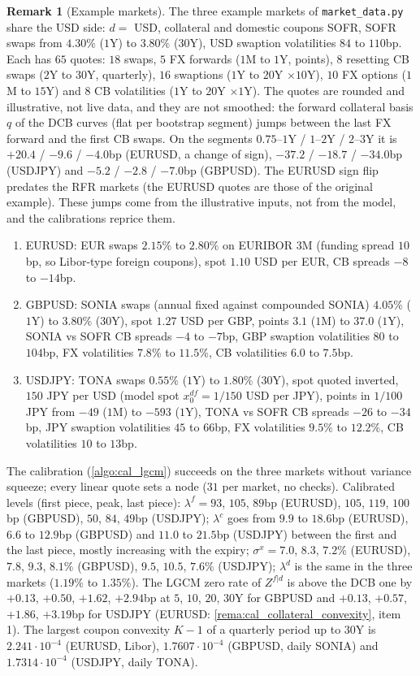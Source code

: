 \documentclass[11pt,english]{amsart}
\theoremstyle{definition}
\newtheorem{rema}{Remark}
\begin{document}
\begin{rema}[Example markets]\label{rema:cal_example_markets}
The three example markets of \texttt{market\_data.py} share the USD side: $d = $ USD, collateral and domestic coupons SOFR, SOFR swaps from $4.30\%$ ($1$Y) to $3.80\%$ ($30$Y), USD swaption volatilities $84$ to $110$bp. Each has $65$ quotes: $18$ swaps, $5$ FX forwards ($1$M to $1$Y, points), $8$ resetting CB swaps ($2$Y to $30$Y, quarterly), $16$ swaptions ($1$Y to $20$Y $\times10$Y), $10$ FX options ($1$M to $15$Y) and $8$ CB volatilities ($1$Y to $20$Y $\times1$Y). The quotes are rounded and illustrative, not live data, and they are not smoothed: the forward collateral basis $q$ of the DCB curves (flat per bootstrap segment) jumps between the last FX forward and the first CB swaps. On the segments $0.75$--$1$Y / $1$--$2$Y / $2$--$3$Y it is $+20.4$ / $-9.6$ / $-4.0$bp (EURUSD, a change of sign), $-37.2$ / $-18.7$ / $-34.0$bp (USDJPY) and $-5.2$ / $-2.8$ / $-7.0$bp (GBPUSD). The EURUSD sign flip predates the RFR markets (the EURUSD quotes are those of the original example). These jumps come from the illustrative inputs, not from the model, and the calibrations reprice them.
\begin{enumerate}
\item EURUSD: EUR swaps $2.15\%$ to $2.80\%$ on EURIBOR 3M (funding spread $10$bp, so Libor-type foreign coupons), spot $1.10$ USD per EUR, CB spreads $-8$ to $-14$bp.
\item GBPUSD: SONIA swaps (annual fixed against compounded SONIA) $4.05\%$ ($1$Y) to $3.80\%$ ($30$Y), spot $1.27$ USD per GBP, points $3.1$ ($1$M) to $37.0$ ($1$Y), SONIA vs SOFR CB spreads $-4$ to $-7$bp, GBP swaption volatilities $80$ to $104$bp, FX volatilities $7.8\%$ to $11.5\%$, CB volatilities $6.0$ to $7.5$bp.
\item USDJPY: TONA swaps $0.55\%$ ($1$Y) to $1.80\%$ ($30$Y), spot quoted inverted, $150$ JPY per USD (model spot $x^{df}_0 = 1/150$ USD per JPY), points in $1/100$ JPY from $-49$ ($1$M) to $-593$ ($1$Y), TONA vs SOFR CB spreads $-26$ to $-34$bp, JPY swaption volatilities $45$ to $66$bp, FX volatilities $9.5\%$ to $12.2\%$, CB volatilities $10$ to $13$bp.
\end{enumerate}
The calibration (\autoref{algo:cal_lgcm}) succeeds on the three markets without variance squeeze; every linear quote sets a node ($31$ per market, no checks). Calibrated levels (first piece, peak, last piece): $\lambda^f = 93$, $105$, $89$bp (EURUSD), $105$, $119$, $100$bp (GBPUSD), $50$, $84$, $49$bp (USDJPY); $\lambda^c$ goes from $9.9$ to $18.6$bp (EURUSD), $6.6$ to $12.9$bp (GBPUSD) and $11.0$ to $21.5$bp (USDJPY) between the first and the last piece, mostly increasing with the expiry; $\sigma^x = 7.0$, $8.3$, $7.2\%$ (EURUSD), $7.8$, $9.3$, $8.1\%$ (GBPUSD), $9.5$, $10.5$, $7.6\%$ (USDJPY); $\lambda^d$ is the same in the three markets ($1.19\%$ to $1.35\%$). The LGCM zero rate of $Z^{f|d}$ is above the DCB one by $+0.13$, $+0.50$, $+1.62$, $+2.94$bp at $5$, $10$, $20$, $30$Y for GBPUSD and $+0.13$, $+0.57$, $+1.86$, $+3.19$bp for USDJPY (EURUSD: \autoref{rema:cal_collateral_convexity}, item 1). The largest coupon convexity $K-1$ of a quarterly period up to $30$Y is $2.241\cdot10^{-4}$ (EURUSD, Libor), $1.7607\cdot10^{-4}$ (GBPUSD, daily SONIA) and $1.7314\cdot10^{-4}$ (USDJPY, daily TONA).

\end{rema}
\end{document}
